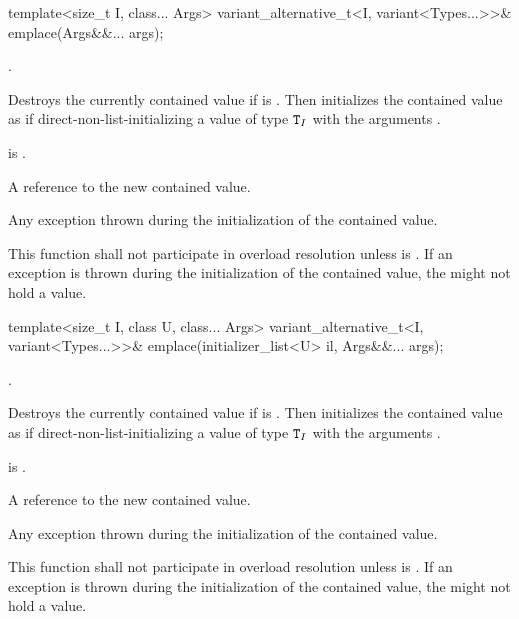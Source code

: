 %
\begin{itemdecl}
template<size_t I, class... Args>
  variant_alternative_t<I, variant<Types...>>& emplace(Args&&... args);
\end{itemdecl}

\begin{itemdescr}
\pnum
\requires
{}.

\pnum
\effects
Destroys the currently contained value if 
is .
Then initializes the contained value as if direct-non-list-initializing
a value of type $\texttt{T}_I$
with the arguments .

\pnum
\postconditions
{} is .

\pnum
\returns
A reference to the new contained value.

\pnum
\throws
Any exception thrown during the initialization of the contained value.

\pnum
\remarks
This function shall not participate in overload resolution unless
 is .
If an exception is thrown during the initialization of the contained value,
the  might not hold a value.
\end{itemdescr}

%
\begin{itemdecl}
template<size_t I, class U, class... Args>
  variant_alternative_t<I, variant<Types...>>& emplace(initializer_list<U> il, Args&&... args);
\end{itemdecl}

\begin{itemdescr}
\pnum
\requires
{}.

\pnum
\effects
Destroys the currently contained value if 
is .
Then initializes the contained value as if direct-non-list-initializing
a value of type $\texttt{T}_I$
with the arguments .

\pnum
\postconditions
{} is .

\pnum
\returns
A reference to the new contained value.

\pnum
\throws
Any exception thrown during the initialization of the contained value.

\pnum
\remarks
This function shall not participate in overload resolution unless
 is .
If an exception is thrown during the initialization of the contained value,
the  might not hold a value.
\end{itemdescr}

